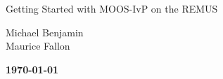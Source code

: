\documentclass[onecolumn,letterpaper,11pt]{article}
\begin{document}
%

\thispagestyle{empty} \vspace{4cm}

\begin{center}
\begin{huge}
Getting Started with MOOS-IvP on the REMUS
\end{huge}
\vspace{0.5in}

Michael Benjamin \\
Maurice Fallon

\end{center}





\begin{center}
\vspace{0.04in} 
{\bf \today}
\end{center}

\newpage  


\newpage
\small


\normalsize
\end{document}
